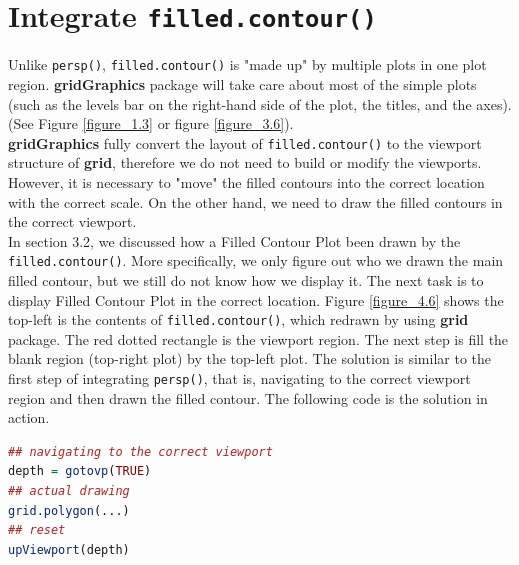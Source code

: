 \documentclass{report}
\begin{document}
\section{Integrate \texttt{filled.contour()}}
Unlike \texttt{persp()}, \texttt{filled.contour()} is "made up" by multiple plots in one plot region. \textbf{gridGraphics} package will take care about most of the simple plots (such as the levels bar on the right-hand side of the plot, the titles, and the axes). (See Figure \ref{figure_1.3} or figure \ref{figure_3.6}).\\
\textbf{gridGraphics} fully convert the layout of \texttt{filled.contour()} to the viewport structure of \textbf{grid}, therefore we do not need to build or modify the viewports. However, it is necessary to "move" the filled contours into the correct location with the correct scale. On the other hand, we need to draw the filled contours in the correct viewport.\\
In section 3.2, we discussed how a Filled Contour Plot been drawn by the \texttt{filled.contour()}. More specifically, we only figure out who we drawn the main filled contour, but we still do not know how we display it. The next task is to display Filled Contour Plot in the correct location. Figure \ref{figure_4.6} shows the top-left is the contents of \texttt{filled.contour()}, which redrawn by using \textbf{grid} package. The red dotted rectangle is the viewport region. The next step is fill the blank region (top-right plot) by the top-left plot. The solution is similar to the first step of integrating \texttt{persp()}, that is, navigating to the correct viewport region and then drawn the filled contour. The following code is the solution in action.
\begin{lstlisting}[language = R]
## navigating to the correct viewport
depth = gotovp(TRUE)
## actual drawing
grid.polygon(...)
## reset
upViewport(depth)
\end{lstlisting}
\end{document}
